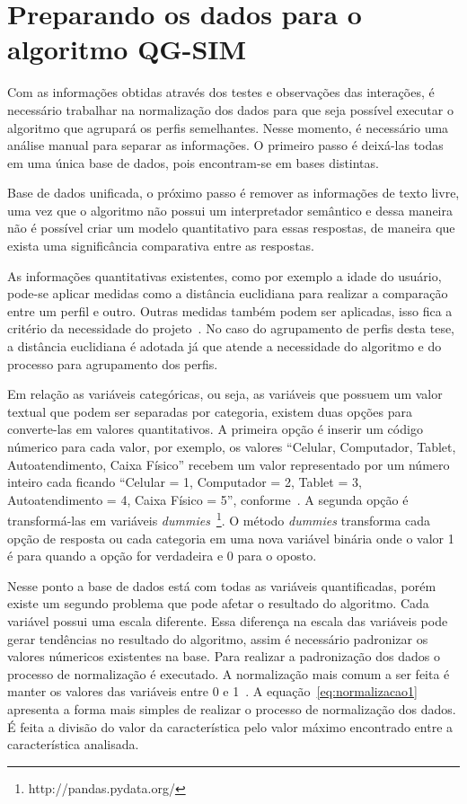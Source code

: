 \section{Preparando os dados para o algoritmo QG-SIM}
\label{sec:preparacao}
Com as informações obtidas através dos testes e observações das interações, é necessário trabalhar na normalização dos dados para que seja possível executar o algoritmo que agrupará os perfis semelhantes. Nesse momento, é necessário uma análise manual para separar as informações. O primeiro passo é deixá-las todas em uma única base de dados, pois encontram-se em bases distintas.

Base de dados unificada, o próximo passo é remover as informações de texto livre, uma vez que o algoritmo não possui um interpretador semântico e dessa maneira não é possível criar um modelo quantitativo para essas respostas, de maneira que exista uma significância comparativa entre as respostas.

As informações quantitativas existentes, como por exemplo a idade do usuário, pode-se aplicar medidas como a distância euclidiana para realizar a comparação entre um perfil e outro. Outras medidas também podem ser aplicadas, isso fica a critério da necessidade do projeto~\cite{masiero:2013}. No caso do agrupamento de perfis desta tese, a distância euclidiana é adotada já que atende a necessidade do algoritmo e do processo para agrupamento dos perfis.

Em relação as variáveis categóricas, ou seja, as variáveis que possuem um valor textual que podem ser separadas por categoria, existem duas opções para converte-las em valores quantitativos. A primeira opção é inserir um código númerico para cada valor, por exemplo, os valores ``Celular, Computador, Tablet, Autoatendimento, Caixa Físico'' recebem um valor representado por um número inteiro cada ficando ``Celular = 1, Computador = 2, Tablet = 3, Autoatendimento = 4, Caixa Físico = 5'', conforme~. A segunda opção é transformá-las em variáveis \emph{dummies}~\footnote{http://pandas.pydata.org/}. O método \emph{dummies} transforma cada opção de resposta ou cada categoria em uma nova variável binária onde o valor 1 é para quando a opção for verdadeira e 0 para o oposto.

Nesse ponto a base de dados está com todas as variáveis quantificadas, porém existe um segundo problema que pode afetar o resultado do algoritmo. Cada variável possui uma escala diferente. Essa diferença na escala das variáveis pode gerar tendências no resultado do algoritmo, assim é necessário padronizar os valores númericos existentes na base. Para realizar a padronização dos dados o processo de normalização é executado. A normalização mais comum a ser feita é manter os valores das variáveis entre 0 e 1~\cite{lattin:2011}. A equação~\ref{eq:normalizacao1} apresenta a forma mais simples de realizar o processo de normalização dos dados. É feita a divisão do valor da característica pelo valor máximo encontrado entre a característica analisada.

